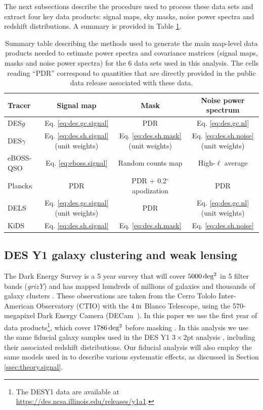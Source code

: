\documentclass[a4paper,11pt]{article}
\newcommand{\kids}{KiDS\xspace}
\newcommand{\dls}{DELS\xspace}
\begin{document}
    The next subsections describe the procedure used to process these data sets and extract four key data products: signal maps, sky masks, noise power spectra and redshift distributions. A summary is provided in Table \ref{tab:data_products}.
    \begin{table}[]
      \small
      \centering
      \begin{tabular}{|l|c|c|c|}
      \hline
      {\bf Tracer} & {\bf Signal map} & {\bf Mask} & {\bf Noise power spectrum} \\
      \hline
      DES$g$ & Eq. \ref{eq:des.gc.signal} & PDR &  Eq. \ref{eq:des.gc.nl} \\
      \hline
      DES$\gamma$ & Eq. \ref{eq:des.sh.signal} (unit weights) & Eq. \ref{eq:des.sh.mask} (unit weights) & Eq. \ref{eq:des.sh.noise} (unit weights)\\
      \hline
      eBOSS-QSO & Eq. \ref{eq:eboss.signal} & Random counts map & High-$\ell$ average \\
      \hline
      Planck$\kappa$ & PDR & PDR $+$ 0.2$^\circ$ apodization & PDR \\
      \hline
      \dls & Eq. \ref{eq:des.gc.signal} (unit weights) & PDR \cite{2010.00466} & Eq. \ref{eq:des.gc.nl} (unit weights)\\
      \hline
      \kids & Eq. \ref{eq:des.sh.signal} & Eq. \ref{eq:des.sh.mask} & Eq. \ref{eq:des.sh.noise}\\
      \hline
      \end{tabular}
      \caption{Summary table describing the methods used to generate the main map-level data products needed to estimate power spectra and covariance matrices (signal maps, masks and noise power spectra) for the 6 data sets used in this analysis. The cells reading ``PDR'' correspond to quantities that are directly provided in the public data release associated with these data.}\label{tab:data_products}
    \end{table}

    \subsection{DES Y1 galaxy clustering and weak lensing}\label{ssec:data.DES}
      The Dark Energy Survey is a 5 year survey that will cover $\unit[5000]{deg^2}$ in 5 filter bands (\textit{grizY}) and has mapped hundreds of millions of galaxies and thousands of galaxy clusters \cite{astro-ph/0510346}. These observations are taken from the Cerro Tololo Inter-American Observatory (CTIO) with the $\unit[4]{m}$ Blanco Telescope, using the 570-megapixel Dark Energy Camera (DECam~\cite{1504.02900}). In this paper we use the first year of data products\footnote{The DESY1 data are available at \url{https://des.ncsa.illinois.edu/releases/y1a1}.}, which cover $\unit[1786]{deg^2}$ before masking \cite{1801.03181,1708.01531}.  In this analysis we use the same fiducial galaxy samples used in the DES Y1 $3\times2$pt analysis \cite{1708.01530}, including their associated redshift distributions. Our fiducial analysis will also employ the same models used in \cite{1708.01530} to describe various systematic effects, as discussed in Section \ref{ssec:theory.signal}.
\end{document}
